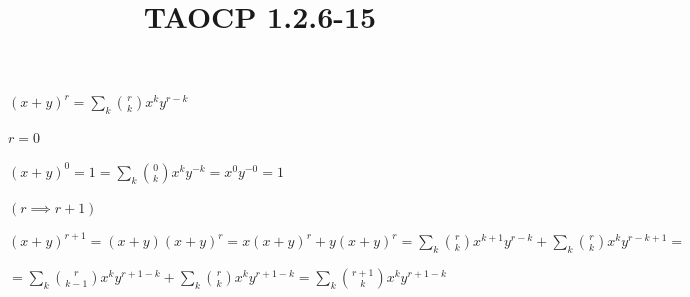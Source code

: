 \documentclass{article}
\title{TAOCP 1.2.6\mbox{-}15}
\begin{document}
\maketitle

\( {(x+y)}^{r} = \sum_{k} \binom{r}{k} x^{k} y^{r-k} \)

\( r = 0 \)

\( {(x+y)}^{0} = 1 = \sum_{k} \binom{0}{k} x^{k} y^{-k} = x^{0}y^{-0} = 1 \)

\( (r \implies r + 1) \)

\( {(x+y)}^{r+1} = (x+y){(x+y)}^{r} = x{(x+y)}^{r} + y{(x+y)}^{r} = \sum_{k} \binom{r}{k} x^{k+1} y^{r-k} + \sum_{k} \binom{r}{k} x^{k} y^{r-k+1} = \)

\( = \sum_{k} \binom{r}{k-1} x^{k} y^{r+1-k} + \sum_{k} \binom{r}{k} x^{k} y^{r+1-k} = \sum_{k} \binom{r+1}{k} x^{k} y^{r+1-k} \)
\end{document}
